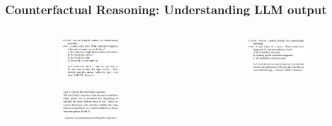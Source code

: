 \documentclass{beamer}
\begin{document}
\begin{frame}
	\frametitle{Counterfactual Reasoning: Understanding LLM output}
	\begin{columns}
		\begin{column}{0.5\textwidth}
			\begin{figure}
				\begin{subfigure}{\textwidth}
					\centering
					\includegraphics[scale=0.5]{imgs/counterfactual_prompt1.png}
				\end{subfigure}
				\begin{subfigure}{\textwidth}
					\centering
					\includegraphics[scale=0.5]{imgs/counterfactual_prompt2.png}	
				\end{subfigure}
			\end{figure}
		\end{column}
		\begin{column}{0.5\textwidth}
			\begin{figure}
				\begin{subfigure}{\textwidth}
					\centering
					\includegraphics[scale=0.5]{imgs/counterfactual_prompt3.png}

\end{subfigure}
\end{figure}
\end{column}
\end{columns}
\end{frame}
\end{document}
